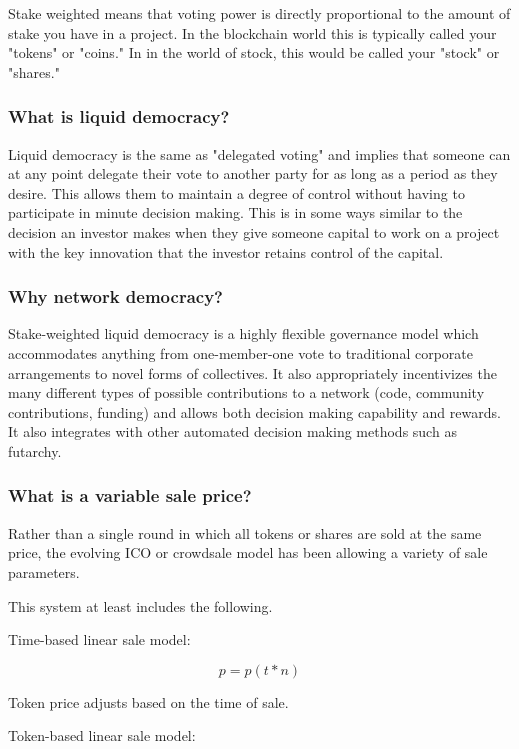 \documentclass{article}
\begin{document}
Stake weighted means that voting power is directly proportional to the amount of stake you have in a project. In the blockchain world this is typically called your "tokens" or "coins." In in the world of stock, this would be called your "stock" or "shares."

\subsubsection {What is liquid democracy?}

Liquid democracy is the same as "delegated voting" and implies that someone can at any point delegate their vote to another party for as long as a period as they desire. This allows them to maintain a degree of control without having to participate in minute decision making. This is in some ways similar to the decision an investor makes when they give someone capital to work on a project with the key innovation that the investor retains control of the capital.

\subsubsection {Why network democracy?}

Stake-weighted liquid democracy is a highly flexible governance model which accommodates anything from one-member-one vote to  traditional corporate arrangements to novel forms of collectives. It also appropriately incentivizes the many different types of possible contributions to a network (code, community contributions, funding) and allows both decision making capability and rewards. It also integrates with other automated decision making methods such as futarchy.

\subsubsection {What is a variable sale price?}

Rather than a single round in which all tokens or shares are sold at the same price, the evolving ICO or crowdsale model has been allowing a variety of sale parameters.

This system at least includes the following.

Time-based linear sale model:

\[ p = p (t * n)  \]

Token price adjusts based on the time of sale.

Token-based linear sale model:
\end{document}
